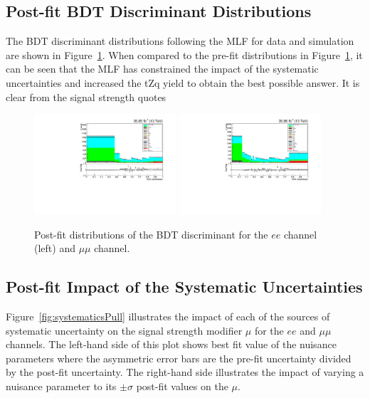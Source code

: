 \subsection{Post-fit BDT Discriminant Distributions}
The BDT discriminant distributions following the MLF for data and simulation are shown in Figure~\ref{fig:postfitBDT}.
When compared to the pre-fit distributions in Figure~\ref{fig:postfitBDT}, it can be seen that the MLF has constrained the impact of the systematic uncertainties and increased the tZq yield to obtain the best possible answer.
It is clear from the signal strength quotes 

\begin{figure}[!Htb]
\centering
\includegraphics[width=0.47\textwidth]{figs/results/postfit_ee.pdf}
\includegraphics[width=0.47\textwidth]{figs/results/postfit_mumu.pdf}
\caption{
Post-fit distributions of the BDT discriminant for the $ee$ channel (left) and $\mu\mu$ channel.}
\label{fig:postfitBDT}
\end{figure}

\subsection{Post-fit Impact of the Systematic Uncertainties}\label{sec:uncertainitiesImpact}
Figure~\ref{fig:systematicsPull} illustrates the impact of each of the sources of systematic uncertainty on the signal strength modifier $\mu$ for the $ee$ and $\mu\mu$ channels.
The left-hand side of this plot shows best fit value of the nuisance parameters where the asymmetric error bars are the pre-fit uncertainty divided by the post-fit uncertainty.
The right-hand side illustrates the impact of varying a nuisance parameter to its $\pm \sigma$ post-fit values on the $\mu$.

